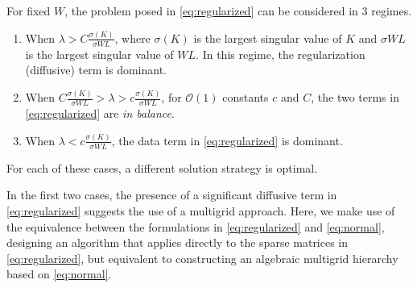 
For fixed $W$, the problem posed in \eqref{eq:regularized} can be
considered in 3 regimes.
\begin{enumerate}
\item When $\lambda > C \frac{\sigma(K)}{\sigma{WL}}$, where
  $\sigma(K)$ is the largest singular value of $K$ and $\sigma{WL}$ is
  the largest singular value of $WL$.  In this regime, the
  regularization (diffusive) term is dominant.
\item When $C \frac{\sigma(K)}{\sigma{WL}} > \lambda > c
  \frac{\sigma(K)}{\sigma{WL}}$, for $\mathcal{O}(1)$ constants $c$
  and $C$, the two terms in \eqref{eq:regularized} are {\it in
    balance}.
\item When $\lambda < c \frac{\sigma(K)}{\sigma{WL}}$, the data term
  in \eqref{eq:regularized} is dominant.
\end{enumerate}
For each of these cases, a different solution strategy is optimal.

In the first two cases, the presence of a significant diffusive term
in \eqref{eq:regularized} suggests the use of a multigrid approach.
Here, we make use of the equivalence between the formulations in
\eqref{eq:regularized} and \eqref{eq:normal}, designing an algorithm
that applies directly to the sparse matrices in
\eqref{eq:regularized}, but equivalent to constructing an algebraic
multigrid hierarchy \cite{} based on \eqref{eq:normal}.

